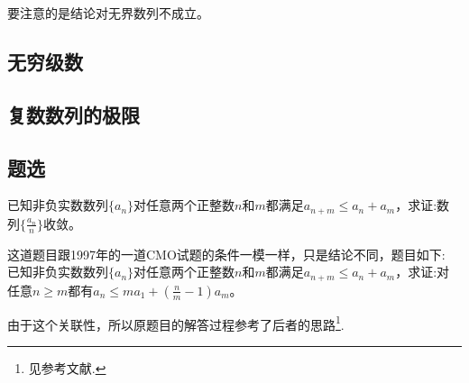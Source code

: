 要注意的是结论对无界数列不成立。

\subsection{无穷级数}
\label{sec:infinite-series}

\subsection{复数数列的极限}
\label{sec:limit-of-complex-number-sequence}

\subsection{题选}
\label{sec:exercises-for-number-sequence-limit}


\begin{exercise}
  已知非负实数数列$\{a_n\}$对任意两个正整数$n$和$m$都满足$a_{n+m} \leqslant a_n+a_m$，求证:数列$\{\frac{a_n}{n}\}$收敛。
\end{exercise}

这道题目跟1997年的一道CMO试题的条件一模一样，只是结论不同，题目如下: 已知非负实数数列$\{a_n\}$对任意两个正整数$n$和$m$都满足$a_{n+m} \leqslant a_n+a_m$，求证:对任意$n \geqslant m$都有$a_n \leqslant ma_1+\left( \frac{n}{m}-1\right)a_m$。

由于这个关联性，所以原题目的解答过程参考了后者的思路\footnote{见参考文献\cite{olympic-math}.}.

